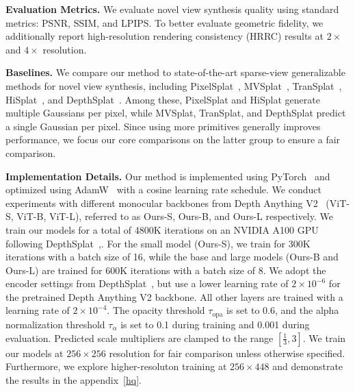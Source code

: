 \noindent\textbf{Evaluation Metrics.}
We evaluate novel view synthesis quality using standard metrics: PSNR, SSIM, and LPIPS. 
To better evaluate geometric fidelity, we additionally report high-resolution rendering consistency (HRRC) results at $2\times$ and $4\times$ resolution.

\noindent\textbf{Baselines.} 
We compare our method to state-of-the-art sparse-view generalizable methods for novel view synthesis, including PixelSplat~\cite{charatan2024pixelsplat}, MVSplat~\cite{chen2024mvsplat}, TranSplat~\cite{zhang2025transplat}, HiSplat~\cite{tang2024hisplat}, and DepthSplat~\cite{xu2024depthsplat}. 
Among these, PixelSplat and HiSplat generate multiple Gaussians per pixel, while MVSplat, TranSplat, and DepthSplat predict a single Gaussian per pixel. 
Since using more primitives generally improves performance, we focus our core comparisons on the latter group to ensure a fair comparison.

\noindent\textbf{Implementation Details.} 
Our method is implemented using PyTorch~\cite{paszke2019pytorch} and optimized using AdamW~\cite{loshchilov2017decoupled} with a cosine learning rate schedule. 
We conduct experiments with different monocular backbones from Depth Anything V2~\cite{yang2024depth} (ViT-S, ViT-B, ViT-L), referred to as Ours-S, Ours-B, and Ours-L respectively. 
We train our models for a total of 4800K iterations on an NVIDIA A100 GPU following DepthSplat~\cite{xu2024depthsplat},. 
For the small model (Ours-S), we train for 300K iterations with a batch size of 16, while the base and large models (Ours-B and Ours-L) are trained for 600K iterations with a batch size of 8.
We adopt the encoder settings from DepthSplat~\cite{xu2024depthsplat}, but use a lower learning rate of $2 \times 10^{-6}$ for the pretrained Depth Anything V2 backbone. All other layers are trained with a learning rate of $2 \times 10^{-4}$. 
The opacity threshold $\tau_{\text{opa}}$ is set to 0.6, and the alpha normalization threshold $\tau_{\alpha}$ is set to 0.1 during training and 0.001 during evaluation. Predicted scale multipliers are clamped to the range $[\frac{1}{3}, 3]$. We train our models at $256 \times 256$ resolution for fair comparison unless otherwise specified. Furthermore, we explore higher-resoluton training at $256 \times 448$ and demonstrate the results in the appendix~\ref{hq}.

